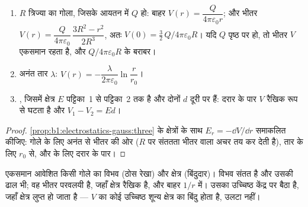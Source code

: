 \begin{proposition}\label{prop:b1:potential-capacitors:classic}
\begin{enumerate}
  \item $R$ त्रिज्या का गोला, जिसके आयतन में $Q$ हो: बाहर $V(r) = \dfrac{Q}{4\pi\varepsilon_0r}$;
        और भीतर $V(r) = \dfrac{Q}{4\pi\varepsilon_0}\,\dfrac{3R^2 - r^2}{2R^3}$,
        अतः $V(0) = \tfrac32\,Q/4\pi\varepsilon_0R$। यदि $Q$ पृष्ठ पर हो, तो भीतर
        $V$ एकसमान रहता है, और $Q/4\pi\varepsilon_0R$ के बराबर।
  \item अनंत तार $\lambda$: $V(r) = -\dfrac{\lambda}{2\pi\varepsilon_0}\ln\dfrac{r}{r_0}$।
  \item {}, जिसमें क्षेत्र $E$ पट्टिका~1 से पट्टिका~2 तक है और
        दोनों $d$ दूरी पर हैं: दरार के पार $V$ रैखिक रूप से घटता है और $V_1 - V_2 = Ed$।
\end{enumerate}
\end{proposition}

\begin{proof}
\cref{prop:b1:electrostatics-gauss:three} के क्षेत्रों के साथ
$E_r = -\dd V/\dd r$ समाकलित कीजिए: गोले के लिए अनंत से भीतर की ओर ($R$ पर
संततता भीतर वाला अचर तय कर देती है), तार के लिए $r_0$ से, और  के
लिए दरार के पार।
\end{proof}

\begin{omfigure}

{\small एकसमान आवेशित किसी गोले का विभव (ठोस रेखा) और क्षेत्र (बिंदुदार)।
विभव संतत है और उसकी ढाल भी; वह भीतर परवलयी है, जहाँ क्षेत्र रैखिक है, और
बाहर $1/r$ में। उसका उच्चिष्ठ केंद्र पर बैठा है, जहाँ क्षेत्र लुप्त हो जाता
है --- $V$ का कोई उच्चिष्ठ शून्य क्षेत्र का बिंदु होता है, उलटा नहीं।}
\end{omfigure}

